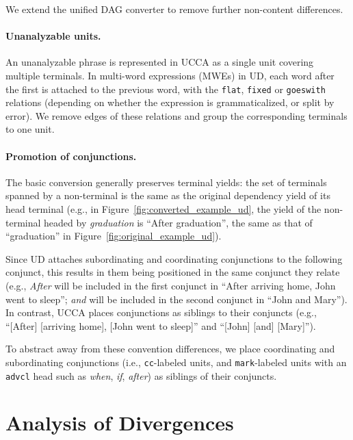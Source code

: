\documentclass[11pt,a4paper,table]{article}
\begin{document}
We extend the unified DAG converter to remove further non-content differences.

\paragraph{Unanalyzable units.}
An unanalyzable phrase is represented in UCCA as a single unit covering multiple terminals.
In multi-word expressions (MWEs) in UD, each word after the first is attached to the previous word,
with the \texttt{flat}, \texttt{fixed} or \texttt{goeswith} relations
(depending on whether the expression is grammaticalized, or split by error).
We remove edges of these relations and group the corresponding terminals to one unit.

\paragraph{Promotion of conjunctions.}
The basic conversion generally preserves terminal yields:
the set of terminals spanned by a non-terminal is the same
as the original dependency yield of its head terminal
(e.g., in Figure~\ref{fig:converted_example_ud}, the yield of the non-terminal
headed by \textit{graduation} is ``After graduation'', the same as that of ``graduation''
in Figure~\ref{fig:original_example_ud}).

Since UD attaches subordinating and coordinating conjunctions to the following conjunct,
this results in them being positioned in the same conjunct they relate (e.g.,
\textit{After} will be included in the first conjunct in ``After arriving home, John went to sleep'';
\textit{and} will be included in the second conjunct in ``John and Mary'').
In contrast, UCCA places conjunctions as siblings to their conjuncts (e.g.,
``[After] [arriving home], [John went to sleep]'' and ``[John] [and] [Mary]''). 

To abstract away from these convention differences,
we place 
coordinating and subordinating conjunctions 
(i.e., \texttt{cc}-labeled units, and \texttt{mark}-labeled units with an \texttt{advcl} head such 
as \textit{when}, \textit{if}, \textit{after}) as siblings of their conjuncts.


\section{Analysis of Divergences}\label{sec:analysis}
\end{document}
